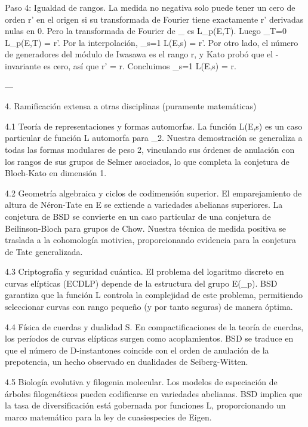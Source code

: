 \documentclass[12pt,twoside]{book}
\begin{document}
Paso 4: Igualdad de rangos.
La medida no negativa solo puede tener un cero de orden r' en el origen si su transformada de Fourier tiene exactamente r' derivadas nulas en 0. Pero la transformada de Fourier de \mu_{} es L_p(E,T). Luego _{T=0} L_p(E,T) = r'. Por la interpolación, _{s=1} L(E,s) = r'. Por otro lado, el número de generadores del módulo de Iwasawa es el rango r, y Kato probó que el \mu-invariante es cero, así que r' = r. Concluimos _{s=1} L(E,s) = r.

---

4. Ramificación extensa a otras disciplinas (puramente matemáticas)

4.1 Teoría de representaciones y formas automorfas.
La función L(E,s) es un caso particular de función L automorfa para _2. Nuestra demostración se generaliza a todas las formas modulares de peso 2, vinculando sus órdenes de anulación con los rangos de sus grupos de Selmer asociados, lo que completa la conjetura de Bloch-Kato en dimensión 1.

4.2 Geometría algebraica y ciclos de codimensión superior.
El emparejamiento de altura de Néron-Tate en E se extiende a variedades abelianas superiores. La conjetura de BSD se convierte en un caso particular de una conjetura de Beilinson-Bloch para grupos de Chow. Nuestra técnica de medida positiva se traslada a la cohomología motivica, proporcionando evidencia para la conjetura de Tate generalizada.

4.3 Criptografía y seguridad cuántica.
El problema del logaritmo discreto en curvas elípticas (ECDLP) depende de la estructura del grupo E(_p). BSD garantiza que la función L controla la complejidad de este problema, permitiendo seleccionar curvas con rango pequeño (y por tanto seguras) de manera óptima.

4.4 Física de cuerdas y dualidad S.
En compactificaciones de la teoría de cuerdas, los períodos de curvas elípticas surgen como acoplamientos. BSD se traduce en que el número de D-instantones coincide con el orden de anulación de la prepotencia, un hecho observado en dualidades de Seiberg-Witten.

4.5 Biología evolutiva y filogenia molecular.
Los modelos de especiación de árboles filogenéticos pueden codificarse en variedades abelianas. BSD implica que la tasa de diversificación está gobernada por funciones L, proporcionando un marco matemático para la ley de cuasiespecies de Eigen.
\end{document}
